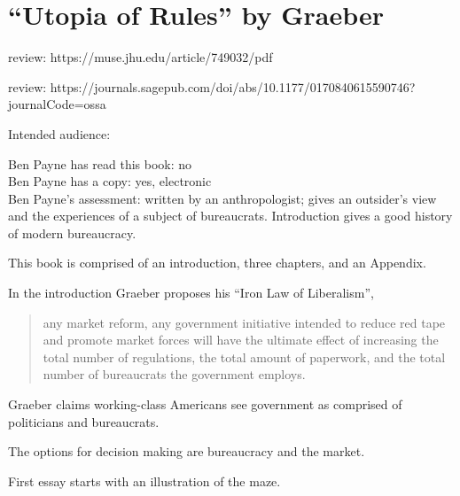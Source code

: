 \section{``Utopia of Rules'' by Graeber\label{review:graeber_utopia}}

\cite{2015_Graeber}

review: https://muse.jhu.edu/article/749032/pdf

review: https://journals.sagepub.com/doi/abs/10.1177/0170840615590746?journalCode=ossa


Intended audience:

Ben Payne has read this book: no\\
Ben Payne has a copy: yes, electronic\\
Ben Payne's assessment: written by an anthropologist; gives an outsider's view and the experiences of a subject of bureaucrats. Introduction gives a good history of modern bureaucracy.


This book is comprised of an introduction, three chapters, and an Appendix. 

In the introduction Graeber proposes his ``Iron Law of Liberalism'',
\begin{quote}
    any market reform, any government initiative intended to reduce red tape and promote market forces will have the ultimate effect of increasing the total number of regulations, the total amount of paperwork, and the total number of bureaucrats the government employs.
\end{quote}

Graeber claims working-class Americans see government as comprised of politicians and bureaucrats.

The options for decision making are bureaucracy and the market.

First essay starts with an illustration of the maze.